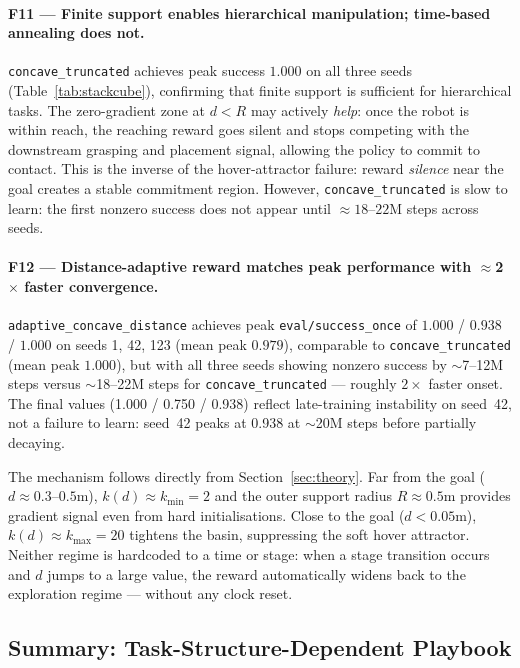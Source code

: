 \documentclass{article}
\begin{document}
\paragraph{F11 --- Finite support enables hierarchical manipulation; time-based annealing does not.}
\texttt{concave\_truncated} achieves peak success $1.000$ on all three seeds
(Table~\ref{tab:stackcube}), confirming that finite support is sufficient for
hierarchical tasks. The zero-gradient zone at $d < R$ may actively \emph{help}: once
the robot is within reach, the reaching reward goes silent and stops competing with the
downstream grasping and placement signal, allowing the policy to commit to contact.
This is the inverse of the hover-attractor failure: reward \emph{silence} near the
goal creates a stable commitment region. However, \texttt{concave\_truncated} is slow
to learn: the first nonzero success does not appear until $\approx\!18$--$22$M steps
across seeds.

\paragraph{F12 --- Distance-adaptive reward matches peak performance with $\approx$2$\times$ faster convergence.}
\texttt{adaptive\_concave\_distance} achieves peak \texttt{eval/success\_once} of
$1.000$ / $0.938$ / $1.000$ on seeds 1, 42, 123 (mean peak $\mathbf{0.979}$),
comparable to \texttt{concave\_truncated} (mean peak $1.000$), but with all three
seeds showing nonzero success by $\sim$7--12M steps versus $\sim$18--22M steps for
\texttt{concave\_truncated} --- roughly $2\times$ faster onset. The final values
(1.000 / 0.750 / 0.938) reflect late-training instability on seed~42, not a failure to
learn: seed~42 peaks at 0.938 at $\sim$20M steps before partially decaying.

The mechanism follows directly from Section~\ref{sec:theory}. Far from the goal
($d \approx 0.3$--$0.5$m), $k(d) \approx k_{\min} = 2$ and the outer support radius
$R \approx 0.5$m provides gradient signal even from hard initialisations. Close to the
goal ($d < 0.05$m), $k(d) \approx k_{\max} = 20$ tightens the basin, suppressing the
soft hover attractor. Neither regime is hardcoded to a time or stage: when a stage
transition occurs and $d$ jumps to a large value, the reward automatically widens back
to the exploration regime --- without any clock reset.

\subsection{Summary: Task-Structure-Dependent Playbook}
\label{sec:playbook-summary}
\end{document}
